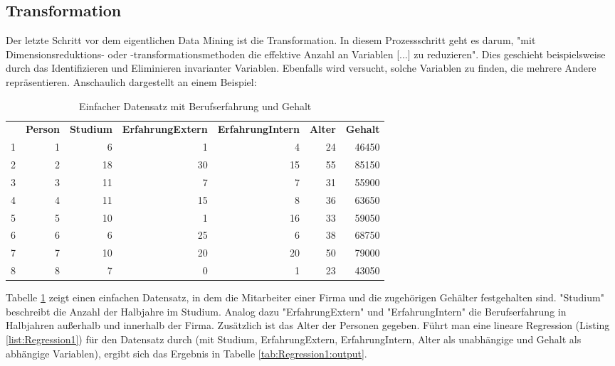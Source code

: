 \subsection{Transformation}
Der letzte Schritt vor dem eigentlichen Data Mining ist die Transformation. In diesem Prozessschritt geht es darum, "mit Dimensionsreduktions- oder -transformationsmethoden die effektive Anzahl an Variablen [...] zu reduzieren"\citep[S.~42; eigene Übersetzung]{fayyad_data_1996}. Dies geschieht beispielsweise durch das Identifizieren und Eliminieren invarianter Variablen. Ebenfalls wird versucht, solche Variablen zu finden, die mehrere Andere repräsentieren. Anschaulich dargestellt an einem Beispiel:\newline
\begin{table}[H] \centering
\begin{tabular}{|r|r|r|r|r|r|r|}
  \hline
 & \textbf{Person} & \textbf{Studium} & \textbf{ErfahrungExtern} & \textbf{ErfahrungIntern} & \textbf{Alter} & \textbf{Gehalt} \\ 
\hhline{=======}
1 &   1 &   6 &   1 &   4 &  24 & 46450 \\ 
  2 &   2 &  18 &  30 &  15 &  55 & 85150 \\ 
  3 &   3 &  11 &   7 &   7 &  31 & 55900 \\ 
  4 &   4 &  11 &  15 &   8 &  36 & 63650 \\ 
  5 &   5 &  10 &   1 &  16 &  33 & 59050 \\ 
  6 &   6 &   6 &  25 &   6 &  38 & 68750 \\ 
  7 &   7 &  10 &  20 &  20 &  50 & 79000 \\ 
  8 &   8 &   7 &   0 &   1 &  23 & 43050 \\ 
   \hline
\end{tabular}
\caption{Einfacher Datensatz mit Berufserfahrung und Gehalt}
\label{tab:Beispiel_Berufserfahrung_R_output_simpleData}
\end{table}
Tabelle \ref{tab:Beispiel_Berufserfahrung_R_output_simpleData} zeigt einen einfachen Datensatz, in dem die Mitarbeiter einer Firma und die zugehörigen Gehälter festgehalten sind. "Studium" beschreibt die Anzahl der Halbjahre im Studium. Analog dazu "ErfahrungExtern" und "ErfahrungIntern" die Berufserfahrung in Halbjahren außerhalb und innerhalb der Firma. Zusätzlich ist das Alter der Personen gegeben.\newline
Führt man eine lineare Regression (Listing \ref{list:Regression1}) für den Datensatz durch (mit Studium, ErfahrungExtern, ErfahrungIntern, Alter als unabhängige und Gehalt als abhängige Variablen), ergibt sich das Ergebnis in Tabelle \ref{tab:Regression1:output}.

